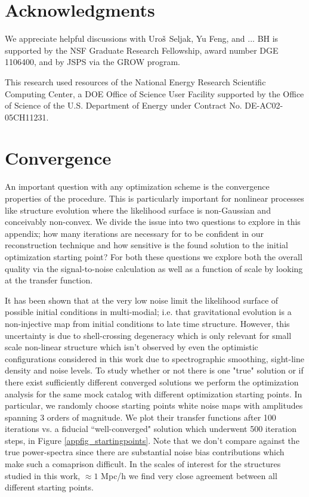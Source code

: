 \documentclass[times]{aastex62}
\begin{document}
\section*{Acknowledgments}
We appreciate helpful discussions with Uro${\rm \check{s}}$ Seljak, Yu Feng, and ... 
BH is supported by the NSF Graduate Research Fellowship, award number DGE 1106400, and by JSPS via the GROW program.

This research used resources of the National Energy Research Scientific Computing Center, a DOE Office of Science User Facility supported by the Office of Science of the U.S. Department of Energy under Contract No. DE-AC02-05CH11231.

\appendix


\section{Convergence}

An important question with any optimization scheme is the convergence properties of the procedure. This is particularly important for nonlinear processes like structure evolution where the likelihood surface is non-Gaussian and conceivably non-convex. We divide the issue into two questions to explore in this appendix; how many iterations are necessary for to be confident in our reconstruction technique and how sensitive is the found solution to the initial optimization starting point? For both these questions we explore both the overall quality via the signal-to-noise calculation \cite{2014LeeObserving} as well as a function of scale by looking at the transfer function.
 
It has been shown that at the very low noise limit the likelihood surface of possible initial conditions in multi-modial; i.e. that gravitational evolution is a non-injective map from initial conditions to late time structure.\cite{2018fengseljakzaldarriaga} However, this uncertainty is due to shell-crossing degeneracy which is only relevant for small scale non-linear structure which isn't observed by even the optimistic configurations considered in this work due to spectrographic smoothing, sight-line density and noise levels. To study whether or not there is one "true" solution or if there exist sufficiently different converged solutions we perform the optimization analysis for the same mock catalog with different optimization starting points. In particular, we randomly choose starting points white noise maps with amplitudes spanning 3 orders of magnitude. We plot their transfer functions after 100 iterations vs. a fiducial ``well-converged" solution which underwent 500 iteration steps, in Figure \ref{appfig_startingpoints}. Note that we don't compare against the true power-spectra since there are substantial noise bias contributions which make such a comaprison difficult. In the scales of interest for the structures studied in this work, $\approx 1$ Mpc/h we find very close agreement between all different starting points. 
\end{document}
